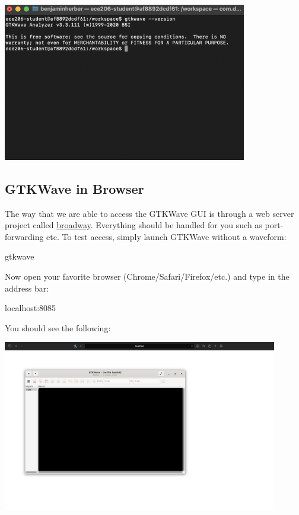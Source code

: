\documentclass[11pt, letterpaper, titlepage, oneside]{memoir}
\begin{document}
            \begin{center}
                \includegraphics[width=0.8\textwidth]{./images/gtkwave_version_confirmation.png}
            \end{center}

        \subsection*{GTKWave in Browser}
            The way that we are able to access the GTKWave GUI is through a web server project called \href{https://docs.gtk.org/gtk3/broadway.html}{broadway}. Everything should be handled for you such as port-forwarding etc. To test access, simply launch GTKWave without a waveform:
            \begin{bash}
                gtkwave
            \end{bash}
            Now open your favorite browser (Chrome/Safari/Firefox/etc.) and type in the address bar:
            \begin{bash}
                localhost:8085
            \end{bash}
            
            \noindent You should see the following:
            
            \begin{center}
                \includegraphics[width=0.9\textwidth]{./images/gtkwave_browser_confirmation.png}
            \end{center}
\end{document}
